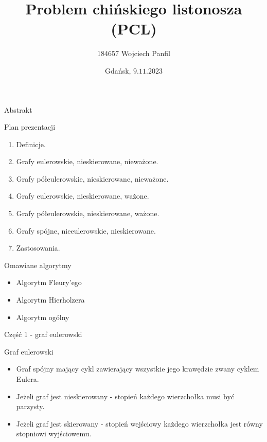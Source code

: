 \documentclass[polish,envcountsect,10pt]{beamer}
\title{Problem chińskiego listonosza (PCL)}
\author{184657 Wojciech Panfil}
\date{Gdańsk, \texorpdfstring{$9.11.2023$}{9.11.2023}}
\begin{document}
\frame{\titlepage}

\begin{frame}{Abstrakt}
    \begin{block}{Plan prezentacji}
        \begin{enumerate}
            \item Definicje.
            \item Grafy eulerowskie, nieskierowane, nieważone.
            \item Grafy półeulerowskie, nieskierowane, nieważone.
            \item Grafy eulerowskie, nieskierowane, ważone.
            \item Grafy półeulerowskie, nieskierowane, ważone.
            \item Grafy spójne, nieeulerowskie, nieskierowane.
            \item Zastosowania.
        \end{enumerate}
    \end{block}
    \begin{block}{Omawiane algorytmy}
        \begin{itemize}
            \item Algorytm Fleury'ego
            \item Algorytm Hierholzera
            \item Algorytm ogólny
        \end{itemize}
    \end{block}
\end{frame}

\begin{frame}{Część 1 - graf eulerowski}
    \begin{block}{Graf eulerowski}
        \begin{itemize}
        \item Graf spójny mający cykl zawierający wszystkie jego krawędzie zwany cyklem Eulera.
        \item Jeżeli graf jest nieskierowany - stopień każdego wierzchołka musi być parzysty.
        \item Jeżeli graf jest skierowany - stopień wejściowy każdego wierzchołka jest równy stopniowi wyjściowemu.
        \end{itemize}
    \end{block}
    \begin{center}
    \end{center}
\end{frame}
\end{document}
